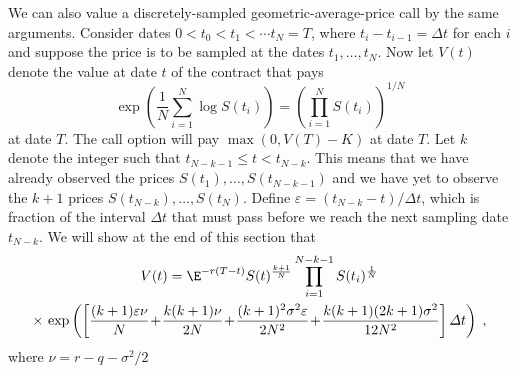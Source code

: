We can also value a discretely-sampled geometric-average-price call by the same arguments.  Consider dates $0<t_0< t_1 < \cdots t_N=T$, where $t_i-t_{i-1}=\varDelta t$ for each $i$ and suppose the price is to be sampled  at the dates $t_1,\ldots,t_N$.  Now let $V(t)$ denote the value at date $t$ of the contract that pays
\begin{equation}\label{geometricaveragev0}
\exp\left(\frac{1}{N} \sum_{i=1}^N \log S(t_i)\right) = \left(\prod_{i=1}^N S(t_i)\right)^{1/N}
\end{equation}
at date $T$.  The call option will pay $\max(0,V(T)-K)$ at date $T$.  Let $k$ denote the integer such that $t_{N-k-1} \leq t < t_{N-k}$.  This means that we have already observed the prices $S(t_1), \ldots, S(t_{N-k-1})$ and we have yet to observe the $k+1$ prices $S(t_{N-k}), \ldots ,S(t_N)$.  Define $\varepsilon = (t_{N\!-k}-t)/\varDelta t$, which is fraction of the interval $\varDelta t$ that must pass before we reach the next sampling date $t_{N\!-k}$.  We will show at the end of this section that 
\begin{multline}\label{geometricaveragev2}
V(t) = \E^{-r(T-t)}S(t)^{\frac{k+1}{N}}\prod_{i=1}^{N-k-1}S(t_i)^{\frac{1}{N}}\\
\times\,\exp\left(\left[ \frac{(k+1)\varepsilon\nu}{N}\!+\! \frac{k(k+1)\nu}{2N}\! +\! \frac{(k+1)^2\sigma^2\varepsilon}{2N^2}\!+\!\frac{k(k+1)(2k+1)\sigma^2}{12N^2} \right]\varDelta t\right)\;,
\end{multline}
where $\nu = r-q-\sigma^2/2$

